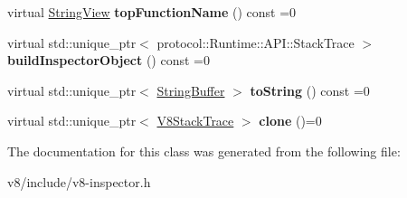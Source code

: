 \begin{DoxyCompactItemize}
virtual \mbox{\hyperlink{classv8__inspector_1_1StringView}{String\+View}} {\bfseries top\+Function\+Name} () const =0
\item 
\mbox{\label{classv8__inspector_1_1V8StackTrace_a6dbec10e0db0c650f43465f75c35c8e3}} 
virtual std\+::unique\+\_\+ptr$<$ protocol\+::\+Runtime\+::\+A\+P\+I\+::\+Stack\+Trace $>$ {\bfseries build\+Inspector\+Object} () const =0
\item 
\mbox{\label{classv8__inspector_1_1V8StackTrace_a05bb91a501d40686481c4971b4dee7f9}} 
virtual std\+::unique\+\_\+ptr$<$ \mbox{\hyperlink{classv8__inspector_1_1StringBuffer}{String\+Buffer}} $>$ {\bfseries to\+String} () const =0
\item 
\mbox{\label{classv8__inspector_1_1V8StackTrace_a5d03e8bfb799b8ced2bfd5c31615d64a}} 
virtual std\+::unique\+\_\+ptr$<$ \mbox{\hyperlink{classv8__inspector_1_1V8StackTrace}{V8\+Stack\+Trace}} $>$ {\bfseries clone} ()=0
\end{DoxyCompactItemize}


The documentation for this class was generated from the following file\+:\begin{DoxyCompactItemize}
\item 
v8/include/v8-\/inspector.\+h\end{DoxyCompactItemize}
